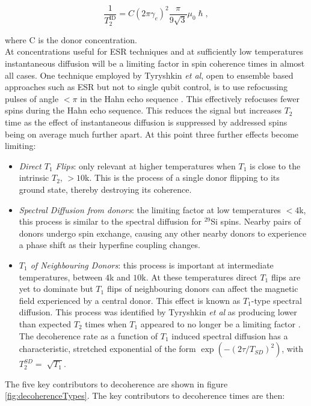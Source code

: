 \begin{equation}
\frac{1}{T_{2}^{\text{ID}}} = C(2\pi\gamma_e)^2\frac{\pi}{9\sqrt{3}}\mu_0\hslash,
\label{eq:instDiff}
\end{equation}

where C is the donor concentration.
\\
At concentrations useful for ESR techniques and at sufficiently low temperatures instantaneous diffusion will be a limiting factor in spin coherence times in almost all cases.
One technique employed by Tyryshkin \textit{et al}, open to ensemble based approaches such as ESR but not to single qubit control, is to use refocussing pulses of angle $<\pi$ in the Hahn echo sequence \cite{Tyryshkin2011}.
This effectively refocuses fewer spins during the Hahn echo sequence. 
This reduces the signal but increases $T_2$ time as the effect of instantaneous diffusion is suppressed by addressed spins being on average much further apart. 
At this point three further effects become limiting:

\begin{itemize}
\item \textit{Direct $T_1$ Flips}: only relevant at higher temperatures when $T_1$ is close to the intrinsic $T_2$, $>10$k. This is the process of a single donor flipping to its ground state, thereby destroying its coherence.
\item \textit{Spectral Diffusion from donors}: the limiting factor at low temperatures $<4$k, this process is similar to the spectral diffusion for $^{29}$Si spins. Nearby pairs of donors undergo spin exchange, causing any other nearby donors to experience a phase shift as their hyperfine coupling changes. 
\item \textit{$T_1$ of Neighbouring Donors}: this process is important at intermediate temperatures, between $4$k and $10$k. At these temperatures direct $T_1$ flips are yet to dominate but $T_1$ flips of neighbouring donors can affect the magnetic field experienced by a central donor. This effect is known as $T_1$-type spectral diffusion.
This process was identified by Tyryshkin \textit{et al} as producing lower than expected $T_2$ times when $T_1$ appeared to no longer be a limiting factor \cite{Tyryshkin2011}. 
The decoherence rate as a function of $T_1$ induced spectral diffusion has a characteristic, stretched exponential of the form $\exp(-(2\tau/T_{SD})^2)$, with $T_2^{SD} = \sqrt[]{T_1}$.
\end{itemize}

The five key contributors to decoherence are shown in figure \ref{fig:decoherenceTypes}.
The key contributors to decoherence times are then:

